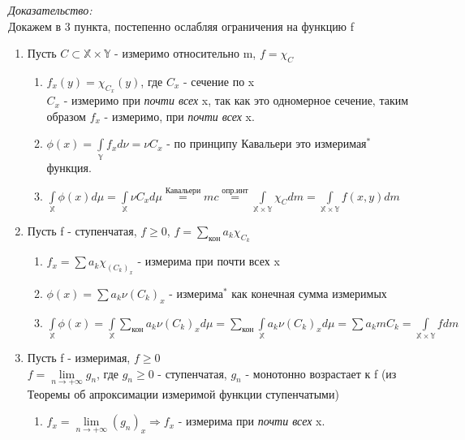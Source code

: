 \documentclass[paper=a4, fontsize=14pt]{report}
\begin{document}
\emph{Доказательство:} \\
Докажем в 3 пункта, постепенно ослабляя ограничения на функцию f
\begin{enumerate}
	\item Пусть $C \subset \mathds{X} \times \mathds{Y}$ - измеримо относительно m, $f = \chi_C$
	\begin{enumerate}
		\item $f_x(y) = \chi_{C_x}(y)$, где $C_x$ - сечение по x \\
		$C_x$ - измеримо при \textit{почти всех} x, так как это одномерное сечение, таким образом $f_x$ - измеримо, при \textit{почти всех} x.
		\item $\phi(x) = \int\limits_{\mathds{Y}}f_xd\nu = \nu C_x$ - по принципу Кавальери это $\text{измеримая}^{\text{*}}$ функция.
		\item $\int\limits_{\mathds{X}}\phi(x)d\mu = \int\limits_{\mathds{X}}\nu C_x d \mu \overset{\text{Кавальери}}{=} mc \overset{\text{опр.инт}}{=} \int\limits_{\mathds{X} \times \mathds{Y}}\chi_C dm = \int\limits_{\mathds{X} \times \mathds{Y}}f(x, y) dm$
	\end{enumerate}
	\item Пусть f - ступенчатая, $f \geq 0$, $f = \sum\limits_{\text{кон}}a_k \chi_{C_k}$ \\
	\begin{enumerate}
		\item $f_x = \sum a_k \chi_{(C_k)_x}$ - измерима при почти всех x \\
		\item $\phi(x) = \sum a_k \nu(C_k)_x$ - $\text{измерима}^{\text{*}}$ как конечная сумма 	измеримых\\
		\item $\int\limits_{\mathds{X}}\phi(x) = \int\limits_{\mathds{X}}\sum\limits_{\text{кон}}a_k \nu (C_k)_x d \mu =
		\sum\limits_{\text{кон}}\int\limits_{\mathds{X}}a_k \nu (C_k)_x d \mu =
		\sum a_k m C_k = \int\limits_{\mathds{X} \times \mathds{Y}}f dm$
	\end{enumerate}
	\item Пусть f - измеримая, $f \geq 0$ \\
	$f = \lim\limits_{n \rightarrow +\infty}g_n$, где $g_n \geq 0$ - ступенчатая, $g_n$ - монотонно возрастает к f (из Теоремы об апроксимации измеримой функции ступенчатыми)
	\begin{enumerate}
		\item $f_x = \lim\limits_{n \rightarrow +\infty}(g_n)_x \Rightarrow f_x$ - измерима при \textit{почти всех} x.

\end{enumerate}
\end{enumerate}
\end{document}
